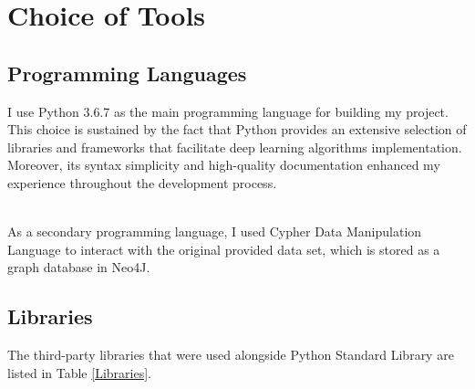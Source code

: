 \section{Choice of Tools}

\subsection{Programming Languages}

I use Python 3.6.7 as the main programming language for building my project. This choice is sustained by the fact that Python provides an extensive selection of libraries and frameworks that facilitate deep learning algorithms implementation. Moreover, its syntax simplicity and high-quality documentation enhanced my experience throughout the development process. \\\

As a secondary programming language, I used Cypher Data Manipulation Language to interact with the original provided data set, which is stored as a graph database in Neo4J.

\subsection{Libraries}

The third-party libraries that were used alongside Python Standard Library are listed in Table \ref{Libraries}. \bigskip

